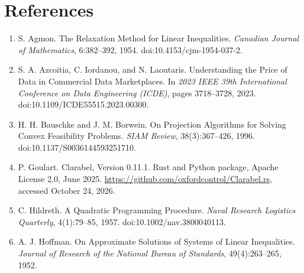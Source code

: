 \documentclass[10pt]{article}
\begin{document}
\section*{References}
\begin{enumerate}
\item S. Agmon. The Relaxation Method for Linear Inequalities. \emph{Canadian Journal of Mathematics}, 6:382--392, 1954. doi:10.4153/cjm-1954-037-2.
\item S. A. Azcoitia, C. Iordanou, and N. Laoutaris. Understanding the Price of Data in Commercial Data Marketplaces. In \emph{2023 IEEE 39th International Conference on Data Engineering (ICDE)}, pages 3718--3728, 2023. doi:10.1109/ICDE55515.2023.00300.
\item H. H. Bauschke and J. M. Borwein. On Projection Algorithms for Solving Convex Feasibility Problems. \emph{SIAM Review}, 38(3):367--426, 1996. doi:10.1137/S0036144593251710.
\item P. Goulart. Clarabel, Version 0.11.1. Rust and Python package, Apache License 2.0, June 2025. \url{https://github.com/oxfordcontrol/Clarabel.rs}, accessed October 24, 2026.
\item C. Hildreth. A Quadratic Programming Procedure. \emph{Naval Research Logistics Quarterly}, 4(1):79--85, 1957. doi:10.1002/nav.3800040113.
\item A. J. Hoffman. On Approximate Solutions of Systems of Linear Inequalities. \emph{Journal of Research of the National Bureau of Standards}, 49(4):263--265, 1952.
\end{enumerate}
\end{document}
